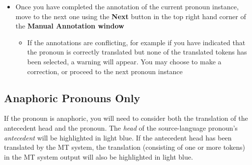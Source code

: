 \documentclass[11pt]{article} %
\begin{document}
\begin{itemize}
  \item Once you have completed the annotation of the current pronoun instance, move to the next one using the \textbf{Next} button in the top right hand corner of the \textbf{Manual Annotation window}
  \begin{itemize}
    \item If the annotations are conflicting, for example if you have indicated that the pronoun is correctly translated but none of the translated tokens has been selected, a warning will appear. You may choose to make a correction, or proceed to the next pronoun instance
  \end{itemize}
\end{itemize}


\subsection{Anaphoric Pronouns Only}
\label{AnaphoricGuidelines}

If the pronoun is anaphoric, you will need to consider both the translation of the antecedent head and the pronoun. The \textit{head} of the source-language pronoun's \textit{antecedent} will be highlighted in light blue. If the antecedent head has been translated by the MT system, the translation (consisting of one or more tokens) in the MT system output will also be highlighted in light blue.
\end{document}
